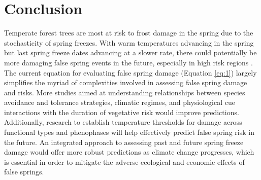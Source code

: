 \documentclass{article}\usepackage[]{graphicx}\usepackage[]{color}
\begin{document}

\section{Conclusion}
Temperate forest trees are most at risk to frost damage in the spring due to the stochasticity of spring freezes. With warm temperatures advancing in the spring but last spring freeze dates advancing at a slower rate, there could potentially be more damaging false spring events in the future, especially in high risk regions \citep{Gu2008, Inouye2008}. The current equation for evaluating false spring damage (Equation \ref{eq:1}) largely simplifies the myriad of complexities involved in assessing false spring damage and risks. More studies aimed at understanding relationships between species avoidance and tolerance strategies, climatic regimes, and physiological cue interactions with the duration of vegetative risk would improve predictions. Additionally, research to establish temperature thresholds for damage across functional types and phenophases will help effectively predict false spring risk in the future. An integrated approach to assessing past and future spring freeze damage would offer more robust predictions as climate change progresses, which is essential in order to mitigate the adverse ecological and economic effects of false springs.

\nocite{Soudani2012}
\nocite{White2009}
\nocite{Schaber2005}
\nocite{Schwartz1993}
\nocite{Barker2005}
\nocite{Sanchez2013}
\nocite{Longstroth2012}
\nocite{Barlow2015}
\nocite{Longstroth2013}

\end{document}
